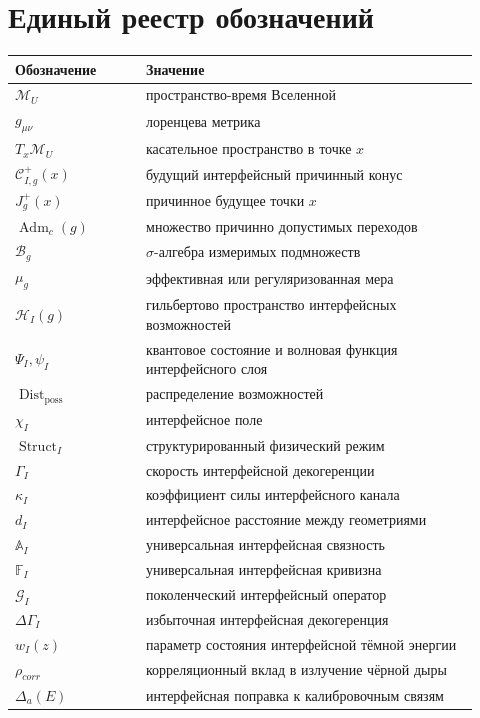 \documentclass[12pt,a4paper]{article}
\DeclareMathOperator{\Adm}{Adm}
\DeclareMathOperator{\Struct}{Struct}
\DeclareMathOperator{\Dist}{Dist}
\newcommand{\M}{\mathcal M_U}
\newcommand{\Hilb}{\mathcal H}
\newcommand{\Acal}{\mathbb A_I}
\newcommand{\Fcal}{\mathbb F_I}
\begin{document}
\section{Единый реестр обозначений}
\begin{longtable}{p{0.26\linewidth}p{0.66\linewidth}}
\toprule
Обозначение & Значение \\
\midrule
$\M$ & пространство-время Вселенной \\
$g_{\mu\nu}$ & лоренцева метрика \\
$T_x\M$ & касательное пространство в точке $x$ \\
$\mathcal C^+_{I,g}(x)$ & будущий интерфейсный причинный конус \\
$J_g^+(x)$ & причинное будущее точки $x$ \\
$\Adm_c(g)$ & множество причинно допустимых переходов \\
$\mathcal B_g$ & $\sigma$-алгебра измеримых подмножеств \\
$\mu_g$ & эффективная или регуляризованная мера \\
$\Hilb_I(g)$ & гильбертово пространство интерфейсных возможностей \\
$\Psi_I,\psi_I$ & квантовое состояние и волновая функция интерфейсного слоя \\
$\Dist_{\mathrm{poss}}$ & распределение возможностей \\
$\chi_I$ & интерфейсное поле \\
$\Struct_I$ & структурированный физический режим \\
$\Gamma_I$ & скорость интерфейсной декогеренции \\
$\kappa_I$ & коэффициент силы интерфейсного канала \\
$d_I$ & интерфейсное расстояние между геометриями \\
$\Acal$ & универсальная интерфейсная связность \\
$\Fcal$ & универсальная интерфейсная кривизна \\
$\mathcal G_I$ & поколенческий интерфейсный оператор \\
$\Delta\Gamma_I$ & избыточная интерфейсная декогеренция \\
$w_I(z)$ & параметр состояния интерфейсной тёмной энергии \\
$\rho_{corr}$ & корреляционный вклад в излучение чёрной дыры \\
$\Delta_a(E)$ & интерфейсная поправка к калибровочным связям \\
\bottomrule
\end{longtable}
\end{document}
